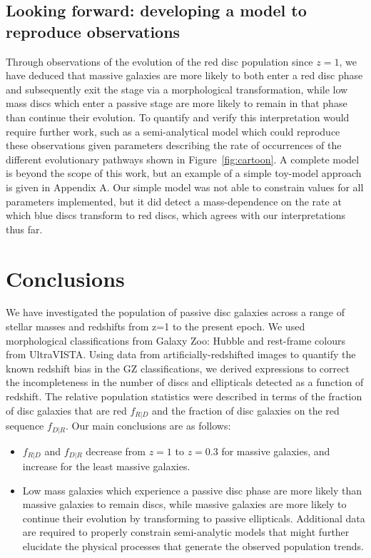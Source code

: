 \documentclass[useAMS,usenatbib]{mn2e}
\begin{document}
\subsection{Looking forward: developing a model to reproduce observations}

Through observations of the evolution of the red disc population since $z=1$, we have deduced that massive galaxies are more likely to both enter a red disc phase and subsequently exit the stage via a morphological transformation, while low mass discs which enter a passive stage are more likely to remain in that phase than continue their evolution. To quantify and verify this interpretation would require further work, such as a semi-analytical model which could reproduce these observations given parameters describing the rate of occurrences of the different evolutionary pathways shown in Figure~\ref{fig:cartoon}. A complete model is beyond the scope of this work, but an example of a simple toy-model approach is given in Appendix A. Our simple model was not able to constrain values for all parameters implemented, but it did detect a mass-dependence on the rate at which blue discs transform to red discs, which agrees with our interpretations thus far. 


\section{Conclusions}
\label{sec:conclusions}

We have investigated the population of passive disc galaxies across a range of stellar masses and redshifts from z=1 to the present epoch. We used morphological classifications from Galaxy Zoo: Hubble and rest-frame colours from UltraVISTA. Using data from artificially-redshifted  images to quantify the known redshift bias in the GZ classifications, we derived expressions to correct the incompleteness in the number of discs and ellipticals detected as a function of redshift. The relative population statistics were described in terms of the fraction of disc galaxies that are red $f_{R|D}$ and the fraction of disc galaxies on the red sequence $f_{D|R}$. Our main conclusions are as follows:

\begin{itemize}

\item{$f_{R|D}$ and $f_{D|R}$ decrease from $z=1$ to $z=0.3$ for massive galaxies, and increase for the least massive galaxies.}

\item{Low mass galaxies which experience a passive disc phase are more likely than massive galaxies to remain discs, while massive galaxies are more likely to continue their evolution by transforming to passive ellipticals. Additional data are required to properly constrain semi-analytic models that might further elucidate the physical processes that generate the observed population trends.}


\end{itemize}
\end{document}
